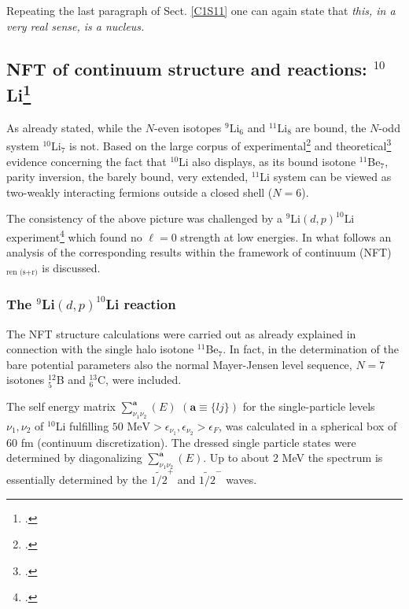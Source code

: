  Repeating the last paragraph of Sect. \ref{C1S11} one can again state that  \textit{this, in a very real sense, is a nucleus.} 
\subsection{NFT of continuum structure and reactions: $^{10}$Li\protect\footnote{\cite{Barranco:20}.}}\label{S5.2.4}
As already stated, while the $N$-even isotopes $^{9}$Li$_6$ and $^{11}$Li$_8$ are bound, the $N$-odd system $^{10}$Li$_7$ is not. Based on the large corpus of experimental\footnote{\label{f5.28}\cite{Wilcox:75,Young:94,Bohlen:97,Caggiano:99,Santi:03,Jeppesen:06,Smith:15,Sanetullaev:16,Kryger:93,Zinser:95,Kobayashi:97,Thoennessen:99,Chartier:01,Simon:07,Aksyutina:13,Amelin:90,Gornov:98,Chernysev:15,Kanungo:15,Tanihata:13,Fortune:18,Tanihata:08}.} and theoretical\footnote{\label{f5.29}\cite{Tanihata:08,Thompson:94,Bertsch:98,Blanchon:07,VinhMau:96,Barker:77,Poppelier:93,Kitagawa:93,Descouvemont:97,Wurzer:96,Kato:93,Garrido:02,Garrido:03,Potel:10,Casal:17,Vinh:95,Nunes:96,Sagawa:93,Myo:08,Barranco:01,Orrigo:09,Moro:19,Barranco:20}.} evidence concerning the fact that $^{10}$Li also displays, as its bound isotone $^{11}$Be$_7$, parity inversion, the barely bound, very extended, $^{11}$Li system can be viewed as two-weakly interacting fermions outside a closed shell ($N=6$). 

The consistency of the above picture was challenged by a $^9$Li$(d,p)^{10}$Li experiment\footnote{\label{f29C5} \cite{Cavallaro:17}.} which found no $\ell=0$ strength at low energies. In what follows an analysis of the corresponding results within the framework of continuum  (NFT)$_{\text{ren (s+r)}}$ is discussed.
\subsubsection{The $^9$Li$(d,p)^{10}$Li reaction}
The NFT structure calculations were carried out as already explained in connection with the single halo isotone $^{11}$Be$_7$. In fact, in the determination of the bare potential parameters also the normal Mayer-Jensen level sequence, $N=7$ isotones $^{12}_5$B and $^{13}_6$C, were included.

The self energy matrix $\sum_{\nu_1\nu_2}^{\mathbf{a}}(E)$ $(\mathbf{a}\equiv\{lj\})$ for the single-particle levels $\nu_1,\nu_2$ of $^{10}$Li fulfilling $50\text{ MeV}>\epsilon_{\nu_1},\epsilon_{\nu_2}>\epsilon_F$, was calculated in a spherical box of 60 fm (continuum discretization). The dressed single particle states were determined by diagonalizing $\sum_{\nu_1\nu_2}^{\mathbf a}(E)$. Up to about 2 MeV the spectrum is essentially determined by the $\widetilde {1/2}^+$ and $\widetilde {1/2}^-$ waves.

